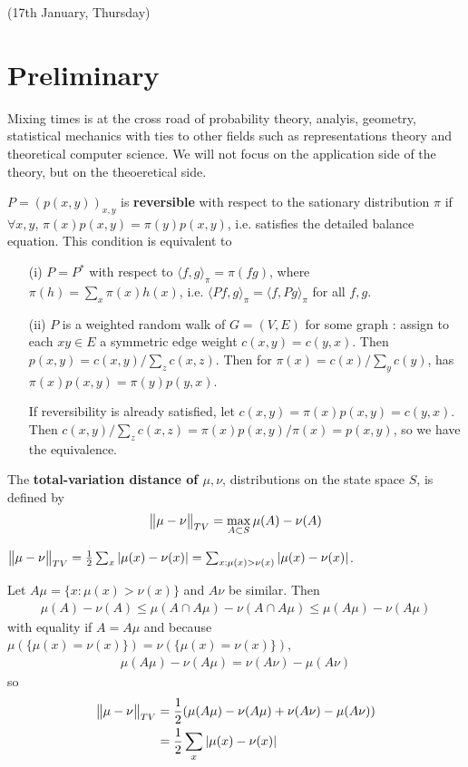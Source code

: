 \documentclass[12pt,a4paper]{article}
\newenvironment{proof}
{\begin{changemargin}{1cm}{0.5cm} 
	}%
	{\end{changemargin}
}
\begin{document}
(17th January, Thursday)

\section{Preliminary}

Mixing times is at the cross road of probability theory, analyis, geometry, statistical mechanics with ties to other fields such as representations theory and theoretical computer science. We will not focus on the application side of the theory, but on the theoeretical side.
\s

\def \emph{(reversibility)} $P= (p(x,y))_{x,y}$ is \textbf{reversible} with respect to the sationary distribution $\pi$ if $\forall x, y$, $\pi(x) p(x,y) = \pi(y) p(x,y)$, i.e. satisfies the detailed balance equation. This condition is equivalent to 
\begin{itemize}
\item[(i)] $P = P^*$ with respect to $\langle f,g\rangle_{\pi} = \pi(fg)$, where $\pi(h) = \sum_{x} \pi(x) h(x)$, i.e. $\langle Pf, g\rangle_{\pi} = \langle f, Pg\rangle_{\pi}$ for all $f,g$.
\item[(ii)] $P$ is a weighted random walk of $G= (V,E)$ for some graph : assign to each $xy\in E$ a symmetric edge weight $c(x,y) = c(y,x)$. Then $p(x,y) = c(x,y)/ \sum_{z} c(x,z)$. Then for $\pi(x) = c(x) / \sum_y c(y)$, has $\pi(x) p(x,y) = \pi(y)p(y,x)$.

\quad If reversibility is already satisfied, let $c(x,y)= \pi(x)p(x,y) = c(y,x)$. Then $c(x,y)/ \sum_z c(x,z) = \pi(x) p(x,y) / \pi(x)=p(x,y)$, so we have the equivalence.
\end{itemize}
\s

 The \textbf{total-variation distance of $\mu, \nu$}, distributions on the state space $S$, is defined by
\begin{align*}
\bigl\lVert\mu - \nu\bigr\rVert_{TV} = \max_{A\subset S} \mu(A) -\nu(A)
\end{align*}
\s

 $\bigl\lVert\mu - \nu\bigr\rVert_{TV} = \frac{1}{2} \sum_x |\mu(x) - \nu(x)| = \sum_{x: \mu(x) > \nu(x)} |\mu(x) - \nu(x)|$.
\begin{proof}
\pf Let $A\mu = \{x: \mu(x) > \nu(x) \}$ and $A\nu$ be similar. Then
\begin{align*}
\mu(A) - \nu(A) \leq \mu(A\cap A\mu) - \nu(A\cap A\mu) \leq \mu(A\mu)-\nu(A\mu)
\end{align*}
with equality if $A = A\mu$ and because $\mu(\{\mu(x)= \nu(x)\}) = \nu(\{\mu(x)= \nu(x)\})$,
\begin{align*}
\mu(A\mu) - \nu(A\mu) = \nu(A\nu)- \mu(A\nu)
\end{align*}
so
\begin{align*}
\bigl\lVert\mu- \nu\bigr\rVert_{TV} &= \frac{1}{2}(\mu(A\mu) - \nu(A\mu) + \nu(A\nu) - \mu(A\nu)) \\
& = \frac{1}{2} \sum_x |\mu(x)- \nu(x)|
\end{align*}
\eop
\end{proof}
\s
\end{document}
